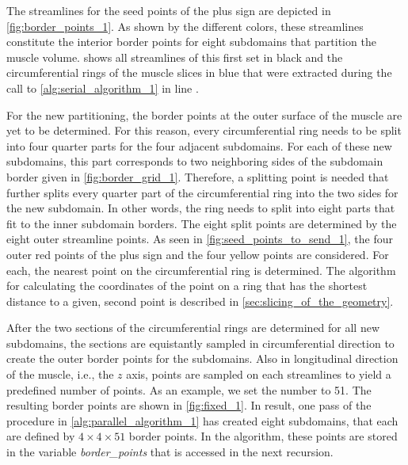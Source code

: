 The streamlines for the seed points of the plus sign are depicted in \cref{fig:border_points_1}. As shown by the different colors, these streamlines constitute the interior border points for eight subdomains that partition the muscle volume.  shows all streamlines of this first set in black and the circumferential rings of the muscle slices in blue that were extracted during the call to \cref{alg:serial_algorithm_1} in line . 

For the new partitioning, the border points at the outer surface of the muscle are yet to be determined. For this reason, every circumferential ring needs to be split into four quarter parts for the four adjacent subdomains. For each of these new subdomains, this part corresponds to two neighboring sides of the subdomain border given in \cref{fig:border_grid_1}. Therefore, a splitting point is needed that further splits every quarter part of the circumferential ring into the two sides for the new subdomain.
In other words, the ring needs to split into eight parts that fit to the inner subdomain borders. The eight split points are determined by the eight outer streamline points. As seen in \cref{fig:seed_points_to_send_1}, the four outer red points of the plus sign and the four yellow points are considered. For each, the nearest point on the circumferential ring is determined. The algorithm for calculating the coordinates of the point on a ring that has the shortest distance to a given, second point is described in \cref{sec:slicing_of_the_geometry}.

After the two sections of the circumferential rings are determined for all new subdomains, the sections are equistantly sampled in circumferential direction to create the outer border points for the subdomains. 
Also in longitudinal direction of the muscle, i.e., the $z$ axis, points are sampled on each streamlines to yield a predefined number of points. As an example, we set the number to 51. The resulting border points are shown in \cref{fig:fixed_1}.
In result, one pass of the procedure in \cref{alg:parallel_algorithm_1} has created eight subdomains, that each are defined by $4 \times 4 \times 51$ border points. In the algorithm, these points are stored in the variable \emph{border\_points} that is accessed in the next recursion.

